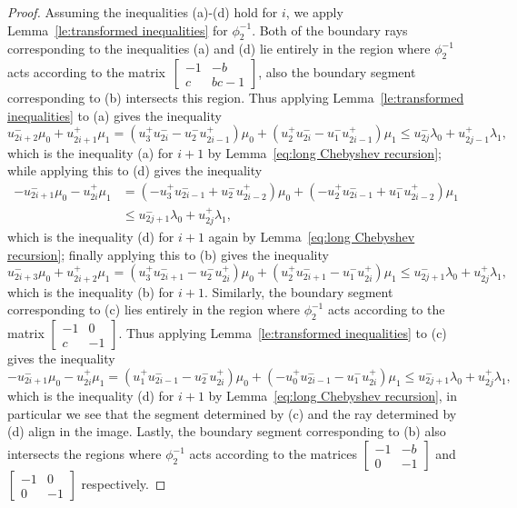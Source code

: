 \documentclass[pdflatex,sn-mathphys]{sn-jnl}%
\theoremstyle{thmstyleone}%
\theoremstyle{thmstyletwo}%
\theoremstyle{thmstylethree}%
\begin{document}
\begin{proof}
    Assuming the inequalities (a)-(d) hold for $i$, we apply Lemma~\ref{le:transformed inequalities} for $\phi_2^{-1}$.
    Both of the boundary rays corresponding to the inequalities (a) and (d) lie entirely in the region where $\phi_2^{-1}$ acts according to the matrix~$\left[ \begin{array}{cc} -1 & -b\\ c & bc-1 \end{array}\right]$, also the boundary segment corresponding to (b) intersects this region.
    Thus applying Lemma~\ref{le:transformed inequalities} to (a) gives the inequality 
    \[u_{2i+2}^-\mu_0+u_{2i+1}^+\mu_1=(u_3^+u_{2i}^--u_2^-u_{2i-1}^+)\mu_0+(u_2^+u_{2i}^--u_1^-u_{2i-1}^+)\mu_1\le u_{2j}^-\lambda_0+u_{2j-1}^+\lambda_1,\]
    which is the inequality (a) for $i+1$ by Lemma~\ref{eq:long Chebyshev recursion}; while applying this to (d) gives the inequality 
    \begin{align*}
      -u_{2i+1}^-\mu_0-u_{2i}^+\mu_1
      &=(-u_3^+u_{2i-1}^-+u_2^-u_{2i-2}^+)\mu_0+(-u_2^+u_{2i-1}^-+u_1^-u_{2i-2}^+)\mu_1\\
      &\le u_{2j+1}^-\lambda_0+u_{2j}^+\lambda_1,
    \end{align*}
    which is the inequality (d) for $i+1$ again by Lemma~\ref{eq:long Chebyshev recursion}; finally applying this to (b) gives the inequality 
    \[u_{2i+3}^-\mu_0+u_{2i+2}^+\mu_1=(u_3^+u_{2i+1}^--u_2^-u_{2i}^+)\mu_0+(u_2^+u_{2i+1}^--u_1^-u_{2i}^+)\mu_1\le u_{2j+1}^-\lambda_0+u_{2j}^+\lambda_1,\]
    which is the inequality (b) for $i+1$.
    Similarly, the boundary segment corresponding to (c) lies entirely in the region where $\phi_2^{-1}$ acts according to the matrix $\left[ \begin{array}{cc} -1 & 0\\ c & -1 \end{array}\right]$.
    Thus applying Lemma~\ref{le:transformed inequalities} to (c) gives the inequality 
    \[-u_{2i+1}^-\mu_0-u_{2i}^+\mu_1=(u_1^+u_{2i-1}^--u_2^-u_{2i}^+)\mu_0+(-u_0^+u_{2i-1}^--u_1^-u_{2i}^+)\mu_1\le u_{2j+1}^-\lambda_0+u_{2j}^+\lambda_1,\]
    which is the inequality (d) for $i+1$ by Lemma~\ref{eq:long Chebyshev recursion}, in particular we see that the segment determined by (c) and the ray determined by (d) align in the image.
    Lastly, the boundary segment corresponding to (b) also intersects the regions where $\phi_2^{-1}$ acts according to the matrices $\left[ \begin{array}{cc} -1 & -b\\ 0 & -1 \end{array}\right]$ and $\left[ \begin{array}{cc} -1 & 0\\ 0 & -1 \end{array}\right]$ respectively.

\end{proof}
\end{document}
